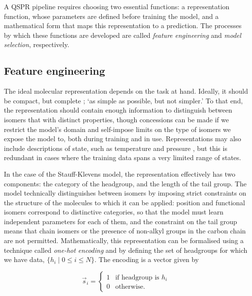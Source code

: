 A QSPR pipeline requires choosing two essential functions: a representation
function, whose parameters are defined before training the model, and a
mathematical form that maps this representation to a prediction. The processes
by which these functions are developed are called \emph{feature engineering} and
\emph{model selection}, respectively.

\subsection{Feature engineering}

The ideal molecular representation depends on the task at hand. Ideally, it
should be compact, but complete
\cite{faberCrystalStructureRepresentations2015,himanenDScribeLibraryDescriptors2020};
`as simple as possible, but not simpler.' To that end, the representation should
contain enough information to distinguish between isomers that with distinct
properties, though concessions can be made if we restrict the model's domain and
self-impose limits on the type of isomers we expose the model to, both during
training and in use. Representations may also include descriptions of state,
such as temperature and pressure \cite{chenGraphNetworksUniversal2019}, but this
is redundant in cases where the training data spans a very limited range of
states.

In the case of the Stauff-Klevens model, the representation effectively has two
components: the category of the headgroup, and the length of the tail group. The
model technically distinguishes between isomers by imposing strict constraints
on the structure of the molecules to which it can be applied: position and
functional isomers correspond to distinctive categories, so that the model must
learn independent parameters for each of them, and the constraint on the tail
group means that chain isomers or the presence of non-alkyl groups in the carbon
chain are not permitted. Mathematically, this representation can be formalised using
a technique called \emph{one-hot encoding} and by defining the set of headgroups for which
we have data, $\{h_i \mid 0 \leq i \leq N\}$. The encoding is a vector given by

\begin{equation}
    \label{eq:one-hot}
    \vec{s}_i = \begin{cases}
        1 & \text{if headgroup is } h_i \\
        0 & \text{otherwise.}
    \end{cases}
\end{equation}

